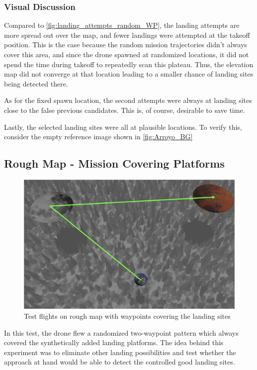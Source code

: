     \subsubsection{Visual Discussion}
    Compared to \cref{fig:landing_attempts_random_WP}, the landing attempts are more spread out over the map, and fewer landings were attempted at the takeoff position. This is the case because the random mission trajectories didn't always cover this area, and since the drone spawned at randomized locations, it did not spend the time during takeoff to repeatedly scan this plateau. Thus, the elevation map did not converge at that location leading to a smaller chance of landing sites being detected there. 
    
    As for the fixed spawn location, the second attempts were always at landing sites close to the false previous candidates. This is, of course, desirable to save time.

    Lastly, the selected landing sites were all at plausible locations. To verify this, consider the empty reference image shown in \cref{fig:Arroyo_BG}

\subsection{Rough Map - Mission Covering Platforms}\label{subsec:rough_coverage}
        \begin{figure}[h]
            \centering
            \includegraphics[scale=0.24]{images/evaluation/rough_over_platforms.png}
            \caption{Test flights on rough map with waypoints covering the landing sites}
            \label{fig:rough_covered}
        \end{figure}

        In this test, the drone flew a randomized two-waypoint pattern which always covered the synthetically added landing platforms. The idea behind this experiment was to eliminate other landing possibilities and test whether the approach at hand would be able to detect the controlled good landing sites.

